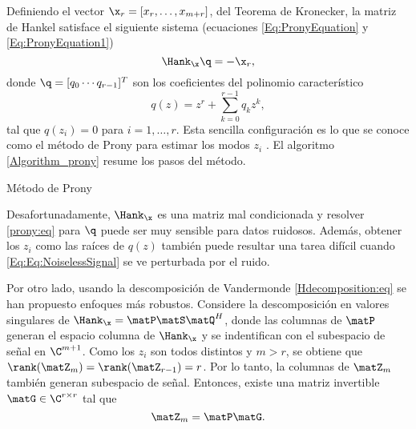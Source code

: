 	Definiendo el vector $\x_r=[x_r,\ldots,x_{m+r}]$, del Teorema de Kronecker, la matriz de Hankel satisface el siguiente sistema (ecuaciones \eqref{Eq:PronyEquation} y \eqref{Eq:PronyEquation1})
	\begin{equation}
		\Hank_{\x} \q = -\x_r,
		\label{prony:eq}
	\end{equation}
	donde $\q = [q_0 \cdots q_{r-1}]^T$ son los coeficientes del polinomio característico 
	\begin{equation} 
		q(z) = z^{r}+\sum_{k=0}^{r-1}q_kz^{k},
		\label{Eq:prony_pol}
	\end{equation}
	tal que $q(z_i)=0$ para $i=1, \ldots , r$.  Esta sencilla configuración es lo que se conoce como el método de Prony para estimar los modos $z_i$ \cite{Prony1975}. El algoritmo \eqref{Algorithm_prony} resume los pasos del método.
	\begin{algorithm}
		\caption{Método de Prony}
		\begin{algorithmic}[1]
		\end{algorithmic}
		\label{Algorithm_prony}
	\end{algorithm} 

	Desafortunadamente, $\Hank_{\x}$ es una matriz mal condicionada y resolver \eqref{prony:eq} para $\q$ puede ser muy sensible para datos ruidosos. Además, obtener los $z_i$ como las raíces de $q(z)$ también puede resultar una tarea difícil cuando \eqref{Eq:Eq:NoiselessSignal} se ve perturbada por el ruido.

	Por otro lado, usando la descomposición de Vandermonde \eqref{Hdecomposition:eq} se han  propuesto enfoques más robustos. Considere la descomposición en valores singulares de $\Hank_{\x} = \matP\matS\matQ^H$, donde las columnas de $\matP$ generan el espacio columna de $\Hank_{\x}$ y se indentifican con el subespacio de señal en $\C^{m+1}$. Como los $z_i$  son todos distintos y $m>r$, se obtiene que $\rank(\matZ_m)=\rank(\matZ_{r-1})=r$. Por lo tanto, la columnas de $\matZ_m$ también generan subespacio de señal. Entonces, existe una matriz invertible $\matG\in\C^{r\times r}$ tal que 
	\begin{equation}
		\matZ_m  = \matP \matG.
		\label{Zm:eq}
	\end{equation}

